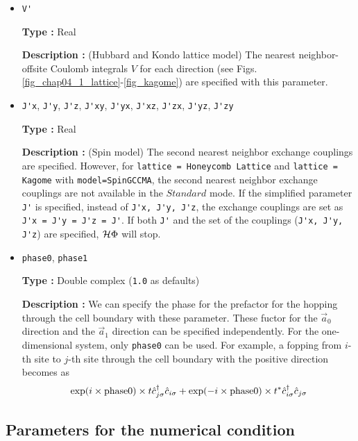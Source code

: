 \begin{itemize}
\item \verb|V'|

{\bf Type :} Real

{\bf Description :} (Hubbard and Kondo lattice model)
The nearest neighbor-offsite Coulomb integrals $V$
 for each direction
(see Figs. \ref{fig_chap04_1_lattice}-\ref{fig_kagome})
are specified with this parameter.

\item \verb|J'x|, \verb|J'y|, \verb|J'z|, \verb|J'xy|, 
  \verb|J'yx|, \verb|J'xz|, \verb|J'zx|, \verb|J'yz|, \verb|J'zy|

{\bf Type :} Real

{\bf Description :} (Spin model)
The second nearest neighbor exchange couplings are specified.
However, for \verb|lattice = Honeycomb Lattice| and  \verb|lattice = Kagome|
with \verb|model=SpinGCCMA|,
the second nearest neighbor exchange couplings are not available in the $Standard$ mode.
If the simplified parameter \verb|J'| is specified, instead of
\verb|J'x, J'y, J'z|,
the exchange couplings are set as
\verb|J'x = J'y = J'z = J'|.
If both \verb|J'| and the set of the couplings (\verb|J'x, J'y, J'z|) are specified,
$\mathcal{H} \Phi$ will stop.

\item \verb|phase0|, \verb|phase1|

  {\bf Type :} Double complex (\verb|1.0| as defaults)
  
  {\bf Description :}
  We can specify the phase for the prefactor for the hopping through the cell boundary
  with these parameter.
  These fuctor for the $\vec{a}_0$ direction and the $\vec{a}_1$ direction can be specified independently.
  For the one-dimensional system, only \verb|phase0| can be used.
  For example, a fopping from $i$-th site to $j$-th site through the cell boundary with the positive direction
  becomes as 
  \begin{align}
    \exp(i \times {\rm phase0}) \times t {\hat c}_{j \sigma}^\dagger {\hat c}_{i \sigma}
    + \exp(-i \times {\rm phase0}) \times t^* {\hat c}_{i \sigma}^\dagger {\hat c}_{j \sigma}
  \end{align}

\end{itemize}

\subsection{Parameters for the numerical condition}

